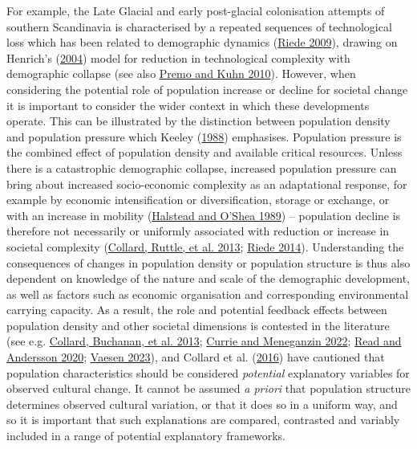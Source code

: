 \documentclass[
  12pt,
  a4paper,
  oneside]{book}
\begin{document}
For example, the Late Glacial and early post-glacial colonisation attempts of southern Scandinavia is characterised by a repeated sequences of technological loss which has been related to demographic dynamics (\protect\hyperlink{ref-riede2009}{Riede 2009}), drawing on Henrich's (\protect\hyperlink{ref-henrich2004}{2004}) model for reduction in technological complexity with demographic collapse (see also \protect\hyperlink{ref-premo2010a}{Premo and Kuhn 2010}). However, when considering the potential role of population increase or decline for societal change it is important to consider the wider context in which these developments operate. This can be illustrated by the distinction between population density and population pressure which Keeley (\protect\hyperlink{ref-keeley1988}{1988}) emphasises. Population pressure is the combined effect of population density and available critical resources. Unless there is a catastrophic demographic collapse, increased population pressure can bring about increased socio-economic complexity as an adaptational response, for example by economic intensification or diversification, storage or exchange, or with an increase in mobility (\protect\hyperlink{ref-halstead1989}{Halstead and O'Shea 1989}) -- population decline is therefore not necessarily or uniformly associated with reduction or increase in societal complexity (\protect\hyperlink{ref-collard2013a}{Collard, Ruttle, et al. 2013}; \protect\hyperlink{ref-riede2014}{Riede 2014}). Understanding the consequences of changes in population density or population structure is thus also dependent on knowledge of the nature and scale of the demographic development, as well as factors such as economic organisation and corresponding environmental carrying capacity. As a result, the role and potential feedback effects between population density and other societal dimensions is contested in the literature (see e.g. \protect\hyperlink{ref-collard2013b}{Collard, Buchanan, et al. 2013}; \protect\hyperlink{ref-currie2022}{Currie and Meneganzin 2022}; \protect\hyperlink{ref-read2020}{Read and Andersson 2020}; \protect\hyperlink{ref-vaesen2023}{Vaesen 2023}), and Collard et al. (\protect\hyperlink{ref-collard2016}{2016}) have cautioned that population characteristics should be considered \emph{potential} explanatory variables for observed cultural change. It cannot be assumed \emph{a priori} that population structure determines observed cultural variation, or that it does so in a uniform way, and so it is important that such explanations are compared, contrasted and variably included in a range of potential explanatory frameworks.
\end{document}
